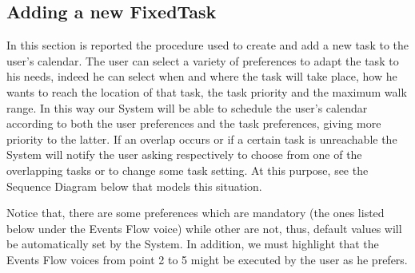 \subsection{Adding a new FixedTask}
In this section is reported the procedure used to create and add a new task to the user's calendar.
The user can select a variety of preferences to adapt the task to his needs, indeed he can select when and where the task will take place, how he wants to reach the location of that task, the task priority and the maximum walk range. In this way our System will be able to schedule the user's calendar according to both the user preferences and the task preferences, giving more priority to the latter. If an overlap occurs or if a certain task is unreachable the System will notify the user asking respectively to choose from one of the overlapping tasks or to change some task setting. At this purpose, see the Sequence Diagram below that models this situation.     

Notice that, there are some preferences which are mandatory (the ones listed below under the Events Flow voice) while other are not, thus, default values will be automatically set by the System. In addition, we must highlight that the Events Flow voices from point 2 to 5 might be executed by the user as he prefers.

